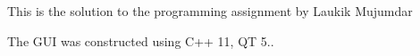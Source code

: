 This is the solution to the programming assignment by Laukik Mujumdar

The G\+UI was constructed using C++ 11, QT 5.. 